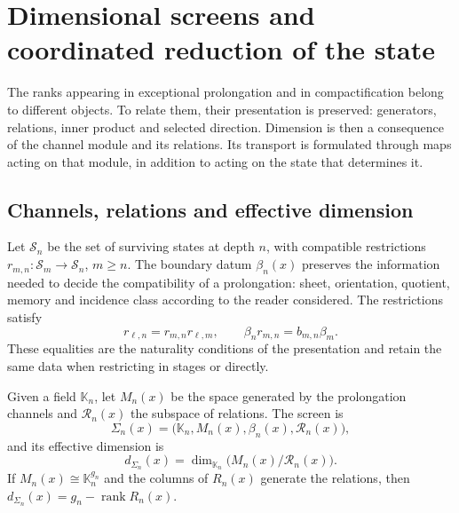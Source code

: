 \section{Dimensional screens and coordinated reduction of the state}
\label{iv:iv:pantallas}

The ranks appearing in exceptional prolongation and in
compactification belong to different objects. To relate them,
their presentation is preserved: generators, relations, inner
product and selected direction. Dimension is then a
consequence of the channel module and its relations. Its
transport is formulated through maps acting on that module,
in addition to acting on the state that determines it.

\subsection{Channels, relations and effective dimension}

Let \(\mathcal S_n\) be the set of surviving states at
depth \(n\), with compatible restrictions
\(r_{m,n}:\mathcal S_m\to\mathcal S_n\), \(m\geq n\).
The boundary datum \(\beta_n(x)\) preserves the information
needed to decide the compatibility of a prolongation:
sheet, orientation, quotient, memory and incidence class according to
the reader considered. The restrictions satisfy
\[
 r_{\ell,n}=r_{m,n}r_{\ell,m},\qquad
 \beta_n r_{m,n}=b_{m,n}\beta_m.
\]
These equalities are the naturality conditions of the
presentation and retain the same data when restricting in
stages or directly.

\begin{definition}
\label{iv:iv:def:pantalla}
Given a field \(\mathbb K_n\), let \(M_n(x)\) be the space
generated by the prolongation channels and \(\mathcal R_n(x)\)
the subspace of relations. The screen is
\[
 \Sigma_n(x)=\bigl(\mathbb K_n,M_n(x),\beta_n(x),
                    \mathcal R_n(x)\bigr),
\]
and its effective dimension is
\begin{equation}
 d_{\Sigma_n}(x)=\dim_{\mathbb K_n}
                    \bigl(M_n(x)/\mathcal R_n(x)\bigr).
 \label{iv:iv:eq:dimension-pantalla}
\end{equation}
If \(M_n(x)\cong\mathbb K_n^{g_n}\) and the columns of
\(R_n(x)\) generate the relations, then
\(d_{\Sigma_n}(x)=g_n-\operatorname{rank}R_n(x)\).
\end{definition}

